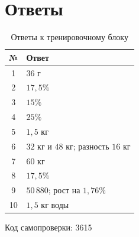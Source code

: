 \documentclass[a4paper,12pt]{article}
\begin{document}
\newpage
\section*{Ответы}

\begin{table}[h]
\centering
\caption{Ответы к тренировочному блоку}
\begin{tabularx}{\linewidth}{@{}cX@{}}
\toprule
№ & Ответ \\
\midrule
1 & $36$ г \\
2 & $17{,}5\%$ \\
3 & $15\%$ \\
4 & $25\%$ \\
5 & $1{,}5$ кг \\
6 & $32$ кг и $48$ кг; разность $16$ кг \\
7 & $60$ кг \\
8 & $17{,}5\%$ \\
9 & $50\,880$; рост на $1{,}76\%$ \\
10 & $1{,}5$ кг воды \\
\bottomrule
\end{tabularx}
\end{table}

\vfill
\begin{center}
  \textcolor{softgray}{Код самопроверки: 3615}
\end{center}
\end{document}
